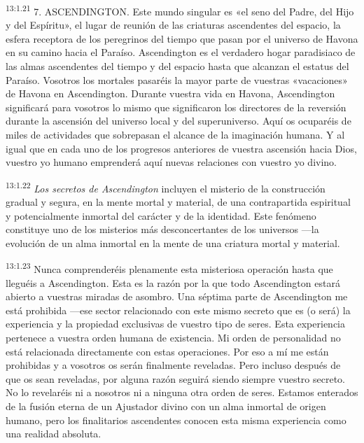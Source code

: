 \par
\textsuperscript{13:1.21} 7. ASCENDINGTON. Este mundo singular es «el seno del Padre, del Hijo y del Espíritu», el lugar de reunión de las criaturas ascendentes del espacio, la esfera receptora de los peregrinos del tiempo que pasan por el universo de Havona en su camino hacia el Paraíso. Ascendington es el verdadero hogar paradisiaco de las almas ascendentes del tiempo y del espacio hasta que alcanzan el estatus del Paraíso. Vosotros los mortales pasaréis la mayor parte de vuestras «vacaciones» de Havona en Ascendington. Durante vuestra vida en Havona, Ascendington significará para vosotros lo mismo que significaron los directores de la reversión durante la ascensión del universo local y del superuniverso. Aquí os ocuparéis de miles de actividades que sobrepasan el alcance de la imaginación humana. Y al igual que en cada uno de los progresos anteriores de vuestra ascensión hacia Dios, vuestro yo humano emprenderá aquí nuevas relaciones con vuestro yo divino.

\par
\textsuperscript{13:1.22} \textit{Los secretos de Ascendington} incluyen el misterio de la construcción gradual y segura, en la mente mortal y material, de una contrapartida espiritual y potencialmente inmortal del carácter y de la identidad. Este fenómeno constituye uno de los misterios más desconcertantes de los universos ---la evolución de un alma inmortal en la mente de una criatura mortal y material.

\par
\textsuperscript{13:1.23} Nunca comprenderéis plenamente esta misteriosa operación hasta que lleguéis a Ascendington. Esta es la razón por la que todo Ascendington estará abierto a vuestras miradas de asombro. Una séptima parte de Ascendington me está prohibida ---ese sector relacionado con este mismo secreto que es (o será) la experiencia y la propiedad exclusivas de vuestro tipo de seres. Esta experiencia pertenece a vuestra orden humana de existencia. Mi orden de personalidad no está relacionada directamente con estas operaciones. Por eso a mí me están prohibidas y a vosotros os serán finalmente reveladas. Pero incluso después de que os sean reveladas, por alguna razón seguirá siendo siempre vuestro secreto. No lo revelaréis ni a nosotros ni a ninguna otra orden de seres. Estamos enterados de la fusión eterna de un Ajustador divino con un alma inmortal de origen humano, pero los finalitarios ascendentes conocen esta misma experiencia como una realidad absoluta.

